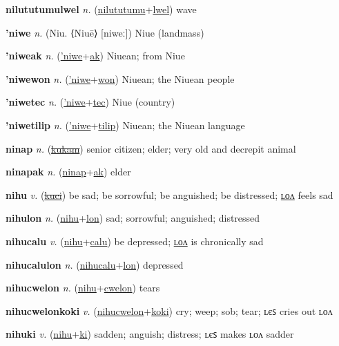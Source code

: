 \textbf{\hypertarget{nilututumulwel}{nilututumulwel}} \textit{n.} (\hyperlink{nilututumu}{nilututumu}+\allowbreak \hyperlink{lwel}{lwel})
wave

\textbf{\hypertarget{'niwe}{'niwe}} \textit{n.} (Niu. ⟨Niuē⟩ [niweː])
Niue (landmass)

\textbf{\hypertarget{'niweak}{'niweak}} \textit{n.} (\hyperlink{'niwe}{'niwe}+\allowbreak \hyperlink{ak}{ak})
Niuean; from Niue

\textbf{\hypertarget{'niwewon}{'niwewon}} \textit{n.} (\hyperlink{'niwe}{'niwe}+\allowbreak \hyperlink{won}{won})
Niuean; the Niuean people

\textbf{\hypertarget{'niwetec}{'niwetec}} \textit{n.} (\hyperlink{'niwe}{'niwe}+\allowbreak \hyperlink{tec}{tec})
Niue (country)

\textbf{\hypertarget{'niwetilip}{'niwetilip}} \textit{n.} (\hyperlink{'niwe}{'niwe}+\allowbreak \hyperlink{tilip}{tilip})
Niuean; the Niuean language

\textbf{\hypertarget{ninap}{ninap}} \textit{n.} (\hyperlink{kukam}{\sout{kukam}})
senior citizen; elder; very old and decrepit animal

\textbf{\hypertarget{ninapak}{ninapak}} \textit{n.} (\hyperlink{ninap}{ninap}+\allowbreak \hyperlink{ak}{ak})
elder

\textbf{\hypertarget{nihu}{nihu}} \textit{v.} (\hyperlink{kuci}{\sout{kuci}})
be sad; be sorrowful; be anguished; be distressed; \hyperlink{nihulon}{ʟᴏᴧ} feels sad

\textbf{\hypertarget{nihulon}{nihulon}} \textit{n.} (\hyperlink{nihu}{nihu}+\allowbreak \hyperlink{lon}{lon})
sad; sorrowful; anguished; distressed

\textbf{\hypertarget{nihucalu}{nihucalu}} \textit{v.} (\hyperlink{nihu}{nihu}+\allowbreak \hyperlink{calu}{calu})
be depressed; \hyperlink{nihucalulon}{ʟᴏᴧ} is chronically sad

\textbf{\hypertarget{nihucalulon}{nihucalulon}} \textit{n.} (\hyperlink{nihucalu}{nihucalu}+\allowbreak \hyperlink{lon}{lon})
depressed

\textbf{\hypertarget{nihucwelon}{nihucwelon}} \textit{n.} (\hyperlink{nihu}{nihu}+\allowbreak \hyperlink{cwelon}{cwelon})
tears

\textbf{\hypertarget{nihucwelonkoki}{nihucwelonkoki}} \textit{v.} (\hyperlink{nihucwelon}{nihucwelon}+\allowbreak \hyperlink{koki}{koki})
cry; weep; sob; tear; ʟєꜱ cries out ʟᴏᴧ

\textbf{\hypertarget{nihuki}{nihuki}} \textit{v.} (\hyperlink{nihu}{nihu}+\allowbreak \hyperlink{ki}{ki})
sadden; anguish; distress; ʟєꜱ makes ʟᴏᴧ sadder

